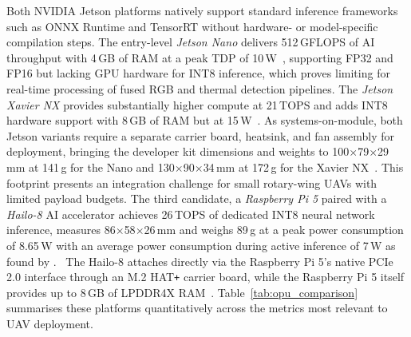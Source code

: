 \documentclass[12pt,oneside,bibtotoc,liststotoc]{scrbook}
\begin{document}
Both NVIDIA Jetson platforms natively support standard
inference frameworks such as ONNX Runtime and TensorRT
without hardware- or model-specific compilation steps. The
entry-level \textit{Jetson Nano} delivers 512\,GFLOPS of AI
throughput with 4\,GB of RAM at a peak TDP of 10\,W~\cite{jetsonNanoComputeModuleDatasheet2024},
supporting FP32 and FP16 but lacking GPU hardware for INT8 inference,
which proves limiting for real-time processing of fused RGB
and thermal detection pipelines. The \textit{Jetson Xavier
    NX} provides substantially higher
compute at 21\,TOPS and adds INT8 hardware support with 8\,GB of RAM but at 15\,W~\cite{jetsonXavierNXDatasheet2020}.
As systems-on-module, both Jetson variants require a
separate carrier board, heatsink, and fan assembly for deployment, bringing
the developer kit dimensions and weights to
100$\times$79$\times$29\,mm at 141\,g for the Nano and
130$\times$90$\times$34\,mm at 172\,g for the Xavier
NX~\cite{jetsonNanoDeveloperKitWeight2019,jetsonXavierNXDevkitWeight,jetsonNanoDeveloperKitSpecification2020,jetsonXavierNXDevKitSpecification2020}.
This footprint presents an integration challenge for small
rotary-wing UAVs with limited payload budgets. The third candidate, a
\textit{Raspberry Pi 5} paired with a \textit{Hailo-8} AI
accelerator achieves 26\,TOPS of dedicated INT8 neural network
inference, measures 86$\times$58$\times$26\,mm and weighs 89\,g at a peak
power consumption of
8.65\,W with an average power consumption during active inference of 7\,W
as found by \citet{pereira2025PerformanceRaspberryPiAIHAT}.~\cite{raspberryPi5datasheet2026,hailo8_m2datasheet2021,hailo8_productBrief2023}
The Hailo-8 attaches directly via the Raspberry Pi 5's
native PCIe 2.0 interface through an M.2 HAT\texttt{+}
carrier board, while the Raspberry Pi 5 itself provides up to 8\,GB of LPDDR4X
RAM~\cite{raspberryPi5datasheet2026}.
Table~\ref{tab:opu_comparison} summarises these platforms
quantitatively across the metrics most relevant to UAV
deployment.
\end{document}
